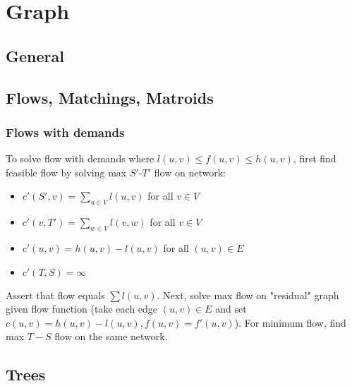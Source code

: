 \chapter{Graph}

\section{General}

\section{Flows, Matchings, Matroids}



	\subsection{Flows with demands}
	To solve flow with demands where $l(u, v) \leq f(u, v) \leq h(u, v)$, 
	first find feasible flow by solving max $S'$-$T'$ flow on network:
	\begin{itemize}[noitemsep,topsep=0pt]
		\item $c'(S',v)=\sum_{u \in V} l(u,v)$ for all $v \in V$
		\item $c'(v, T') = \sum_{w \in V} l(v, w)$ for all $v \in V$
		\item $c'(u, v) = h(u, v) - l(u, v)$ for all $(u, v) \in E$
		\item $c'(T,S)=\infty$
	\end{itemize}
	Assert that flow equals $\sum l(u, v)$. Next, solve max flow 
	on "residual" graph given flow function (take each edge
	$(u, v) \in E$ and set $c(u, v) = h(u, v) - l(u, v), f(u, v) = f'(u, v)$).
	For minimum flow, find max $T-S$ flow on the same network. 


\section{Trees}

